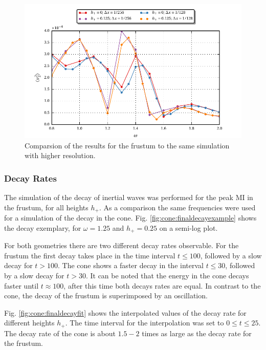 \begin{figure}[!b]
  \centering
  \includegraphics{gfx/cone/final/hd_comparison.pdf}
  \caption{
      \label{fig:cone:finalhdcomp}
      Comparsion of the results for the frustum to the same simulation with higher resolution.
    }
\end{figure}
\clearpage

\subsubsection{Decay Rates}

The simulation of the decay of inertial waves was performed for the peak M\RN{1} in the frustum,
for all heights $h_+$.
As a comparison the same frequencies were used for a simulation of the decay in the cone.
Fig. \ref{fig:cone:finaldecayexample} shows the decay exemplary,
for $\omega=1.25$ and $h_+=0.25$ on a semi-log plot.

For both geometries there are two different decay rates observable.
For the frustum the first decay takes place in the time interval $t\leq 100$,
followed by a slow decay for $t>100$.
The cone shows a faster decay in the interval $ t\leq 30$, followed by a slow decay for $t>30$.
It can be noted that the energy in the cone decays faster until $t\approx100$, after this time
both decays rates are  equal.  In contrast to the cone, the decay of the frustum  is superimposed by an oscillation.

Fig. \ref{fig:cone:finaldecayfit} shows the interpolated values of the decay rate for different
heights $h_+$.  The time interval for the interpolation was set to $0 \leq t \leq 25$.
The decay rate of the cone is about $1.5-2$ times as large as the decay rate for the frustum.

